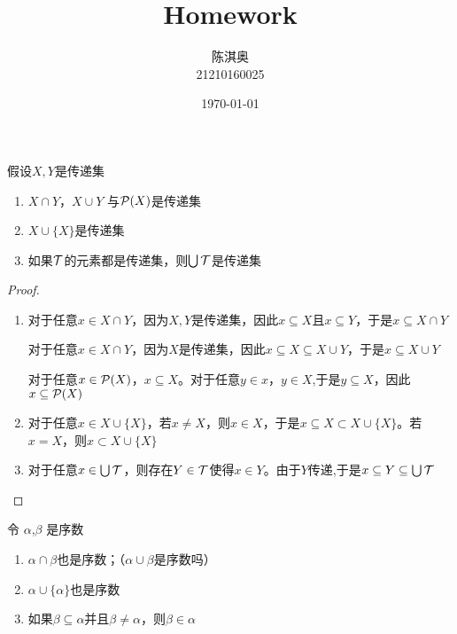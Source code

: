 \documentclass[11pt]{article}
\author{陈淇奥\\21210160025}
\date{\today}
\title{Homework}
\begin{document}
\maketitle
\begin{exercise}[1.3.22]
假设\(X,Y\)是传递集
\begin{enumerate}
\item \(X\cap Y\)，\(X\cup Y\) 与\(\mathcal{P}(X)\)是传递集
\item \(X\cup\{X\}\)是传递集
\item 如果\(\mathcal{T}\)的元素都是传递集，则\(\bigcup\mathcal{T}\)是传递集
\end{enumerate}
\end{exercise}

\begin{proof}
\begin{enumerate}
\item 对于任意\(x\in X\cap Y\)，因为\(X,Y\)是传递集，因此\(x\subseteq X\)且\(x\subseteq Y\)，于是\(x\subseteq X\cap Y\)

对于任意\(x\in X\cap Y\)，因为\(X\)是传递集，因此\(x\subseteq X\subseteq X\cup Y\)，于是\(x\subseteq X\cup Y\)

对于任意\(x\in\mathcal{P}(X)\)，\(x\subseteq X\)。对于任意\(y\in x\)，\(y\in X\),于是\(y\subseteq X\)，因此\(x\subseteq\mathcal{P}(X)\)

\item 对于任意\(x\in X\cup\{X\}\)，若\(x\neq X\)，则\(x\in X\)，于是\(x\subseteq X\subset X\cup\{X\}\)。若\(x=X\)，则\(x\subset X\cup\{X\}\)

\item 对于任意\(x\in\bigcup\mathcal{T}\)，则存在\(Y\in\mathcal{T}\)使得\(x\in Y\)。由于\(Y\)传递,于是\(x\subseteq Y\subseteq\bigcup\mathcal{T}\)
\end{enumerate}
\end{proof}

\begin{exercise}[1.3.27]
令 \(\alpha\),\(\beta\) 是序数
\begin{enumerate}
\item \(\alpha\cap\beta\)也是序数；（\(\alpha\cup\beta\)是序数吗）
\item \(\alpha\cup\{\alpha\}\)也是序数
\item 如果\(\beta\subseteq\alpha\)并且\(\beta\neq\alpha\)，则\(\beta\in\alpha\)
\end{enumerate}
\end{exercise}
\end{document}
